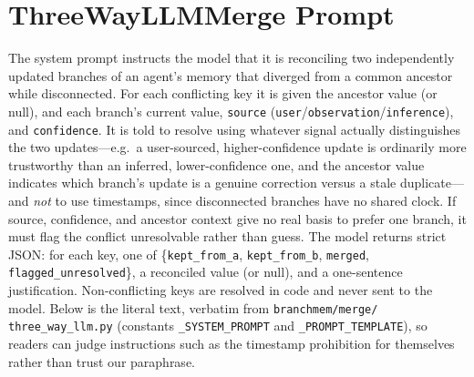 \documentclass[11pt]{article}
\begin{document}


\appendix

\section{ThreeWayLLMMerge Prompt}
\label{sec:prompt}

The system prompt instructs the model that it is reconciling two independently
updated branches of an agent's memory that diverged from a common ancestor while
disconnected. For each conflicting key it is given the ancestor value (or null),
and each branch's current value, \texttt{source}
(\texttt{user}/\texttt{observation}/\texttt{inference}), and \texttt{confidence}.
It is told to resolve using whatever signal actually distinguishes the two
updates---e.g.\ a user-sourced, higher-confidence update is ordinarily more
trustworthy than an inferred, lower-confidence one, and the ancestor value
indicates which branch's update is a genuine correction versus a stale
duplicate---and \emph{not} to use timestamps, since disconnected branches have no
shared clock. If source, confidence, and ancestor context give no real basis to
prefer one branch, it must flag the conflict unresolvable rather than guess. The
model returns strict JSON: for each key, one of
\{\texttt{kept\_from\_a}, \texttt{kept\_from\_b}, \texttt{merged},
\texttt{flagged\_unresolved}\}, a reconciled value (or null), and a one-sentence
justification. Non-conflicting keys are resolved in code and never sent to the
model. Below is the literal text, verbatim from \texttt{branchmem/merge/}
\texttt{three\_way\_llm.py} (constants \texttt{\_SYSTEM\_PROMPT} and
\texttt{\_PROMPT\_TEMPLATE}), so readers can judge instructions such as the
timestamp prohibition for themselves rather than trust our paraphrase.
\end{document}
